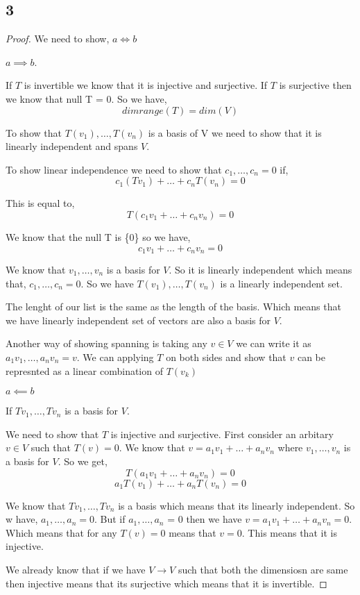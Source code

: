 \documentclass[a4paper]{report}
\begin{document}
\subsection*{3}
\begin{proof}
    
We need to show, $a \iff b$

$a \implies b$.

If  $T$ is invertible we know that it is injective and surjective. If $T$ is surjective then we know that null T = 0. So we have, 
$$ dim range(T) = dim (V) $$ 

To show that $T(v_1),\dots,T(v_n)$ is a basis of V we need to show that it is linearly independent and spans $V$. 

To show linear independence we need to show that $c_1,\dots,c_n = 0$ if,
$$ c_1(Tv_1) + \dots + c_nT(v_n) = 0 $$ 

This is equal to, 
$$ T(c_1v_1 + \dots + c_nv_n) = 0 $$

We know that the null T is \{0\} so we have, 
$$ c_1v_1+ \dots + c_nv_n = 0 $$ 

We know that $v_1,\dots,v_n$ is a basis for $V$. So it is linearly independent which means that, $c_1,\dots,c_n = 0$. So we have $T(v_1),\dots,T(v_n)$ is a linearly independent set.

The lenght of our list is the same as the length of the basis. Which means that we have linearly independent set of vectors are also a basis for $V$.


Another way of showing spanning is taking any $v \in V$ we can write it as $a_1v_1,\dots,a_nv_n = v$. We can applying $T$ on both sides and show that $ v$ can be represnted as a linear combination of $T(v_k)$


$a \impliedby b$

If $Tv_1,\dots,Tv_n$ is a basis for $V$. 

We need to show that $T$ is injective and surjective. First consider an arbitary $v \in V$ such that $T(v) = 0$. We know that  $v = a_1v_1+\dots+a_nv_n$ where $v_1,\dots,v_n$ is a basis for $V$. So we get, 
$$ T(a_1v_1+\dots+a_nv_n) = 0 $$ 
$$ a_1T(v_1) + \dots + a_nT(v_n) = 0 $$ 

We know that $Tv_1,\dots,Tv_n$ is a basis which means that its linearly independent. So w have, $a_1,\dots,a_n = 0$. But if $a_1,\dots,a_n$ = 0 then we have $v = a_1v_1+\dots+a_nv_n = 0$. Which means that for any $T(v) = 0$ means that $v = 0$. This means that it is injective.

We already know that if we have $V \rightarrow V$ such that both the dimensiosn are same then injective  means that its surjective which means that it is invertible.


\end{proof}
\end{document}
